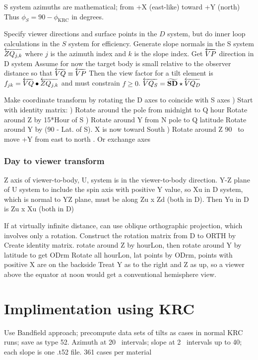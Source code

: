 \documentclass{article}
\begin{document}
S system azimuths are mathematical; from +X (east-like) toward +Y (north)
Thus $\phi_S= 90-\phi_\mathrm{KRC}$ in degrees.

 Specify viewer directions and surface points in the $D$ system, but do inner
 loop calculations in the $S$ system for efficiency. Generate slope normals in
 the S system $\overleftarrow{ZQ_{j,k}}$ where $j$ is the azimuth index and $k$ is the
 slope index.
\qi Get $\overleftarrow{VP}  $ direction in D system
\qii Assume for now the target body is small relative to the observer distance so that $\overleftarrow{VQ} \equiv \overleftarrow{VP}$ 
\qi Then the view factor for a tilt element is  $f_{jk}=\overleftarrow{VQ} \bullet \overleftarrow{ZQ_{j,k}} $ and must constrain  $f \geq 0$.
\qi $\overleftarrow{VQ_S} = \widetilde {\mathbf{ SD }} \star  \overleftarrow{VQ_D}$  

Make  coordinate transform by rotating the D axes to coincide with S axes
) Start with identity matrix: 
) Rotate around the pole from midnight to Q hour \qt Rotate around Z by 15*Hour of S
) Rotate around Y from N pole to Q latitude \qt Rotate around Y by (90 - Lat. of S). X is now toward South
) Rotate around Z 90\qd~ to move +Y from east to north \qt . Or exchange axes

\subsubsection{Day to viewer transform}
Z axis of viewer-to-body, U, system is in the viewer-to-body direction. 
Y-Z plane of U system to include the spin axis with positive Y value, so Xu in D system, which is normal to YZ plane, must be along Zu x Zd (both in D). Then Yu in D is Zu x Xu (both in D)

If at virtually infinite distance, can use oblique orthographic projection, which involves only a rotation.  Construct the rotation matrix from D to ORTH by 
\qi Create identity matrix. rotate around Z by hourLon, then rotate around Y by latitude to get ODrm
\qi Rotate all hourLon, lat points by ODrm, points with positive X are on the backside 
\qi Treat Y as to the right and Z as up, so a viewer above the equator at noon would get a conventional hemisphere view.


\section{Implimentation using KRC}
Use Bandfield approach; precompute data sets of tilts as cases in
normal KRC runs; save as type 52. Azimuth at 20\qd~ intervals; slope at 2\qd~
intervals up to 40\qd; each slope is one .t52 file. 361 cases per material
\end{document}
